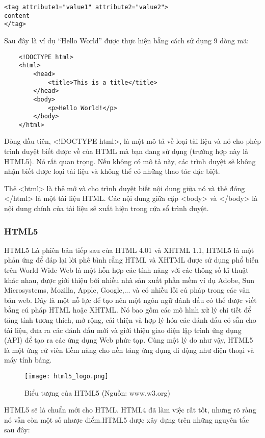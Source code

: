 \begin{lstlisting}
<tag attribute1="value1" attribute2="value2">
content
</tag>
\end{lstlisting}

Sau đây là ví dụ “Hello World” được thực hiện bằng cách sử dụng 9 dòng mã:

\begin{lstlisting}
	<!DOCTYPE html>
	<html>
   		<head>
     		<title>This is a title</title>
   		</head>
   		<body>
   			<p>Hello World!</p>
   		</body>
 	</html>
\end{lstlisting}


Dòng đầu tiên, <!DOCTYPE html>, là một mô tả về loại tài liệu và nó cho phép trình duyệt biết được về của HTML mà bạn đang sử dụng (trường hợp này là HTML5). Nó rất quan trọng. Nếu không có mô tả này, các trình duyệt sẽ không nhận biết được loại tài liệu và không thể có những thao tác đặc biệt.

Thẻ <html> là thẻ mở và cho trình duyệt biết nội dung giữa nó và thẻ đóng </html> là một tài liệu HTML. Các nội dung giữa cặp <body> và </body> là nội dung chính của tài liệu sẽ xuất hiện trong cửa sổ trình duyệt.


\subsubsection{HTML5}
HTML5 Là phiên bản tiếp sau của HTML 4.01 và XHTML 1.1, HTML5 là một phản ứng để đáp lại lời phê bình rằng HTML và XHTML được sử dụng phổ biến trên World Wide Web là một hỗn hợp các tính năng với các thông số kĩ thuật khác nhau, được giới thiệu bởi nhiều nhà sản xuất phần mềm ví dụ Adobe, Sun Microsystems, Mozilla, Apple, Google,... và có nhiều lỗi cú pháp trong các văn bản web. Đây là một nỗ lực để tạo nên một ngôn ngữ đánh dấu có thể được viết bằng cú pháp HTML hoặc XHTML. Nó bao gồm các mô hình xử lý chi tiết để tăng tính tương thích, mở rộng, cải thiện và hợp lý hóa các đánh dấu có sẵn cho tài liệu, đưa ra các đánh đấu mới và giới thiệu giao diện lập trình ứng dụng (API) để tạo ra các ứng dụng Web phức tạp. Cùng một lý do như vậy, HTML5 là một ứng cử viên tiềm năng cho nền tảng ứng dụng di động như điện thoại và máy tính bảng.

\begin{figure}[!h] 
\centering
\texttt{[image: html5\_logo.png]}
\caption{Biểu tượng của HTML5 (Nguồn: www.w3.org)}
\end{figure}

HTML5 sẽ là chuẩn mới cho HTML. HTML4 đã làm việc rất tốt, nhưng rõ ràng nó vẫn còn một số nhược điểm.HTML5 được xây dựng trên những nguyên tắc sau đây:

